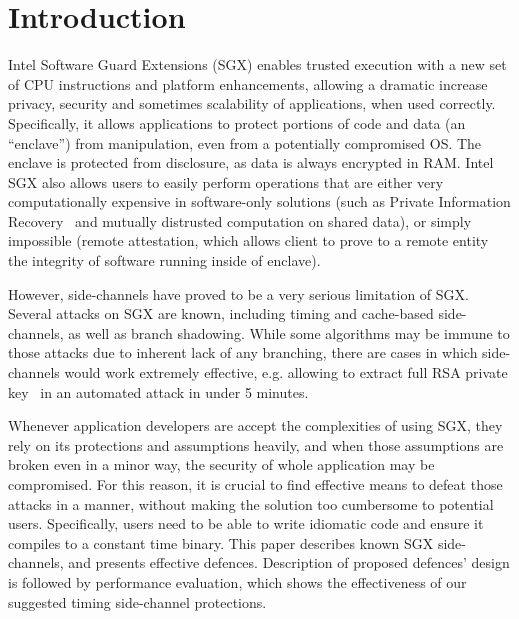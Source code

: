 \documentclass[sigplan, review]{acmart}
\begin{document}
\section{Introduction}
Intel Software Guard Extensions (SGX) enables trusted execution with a new set of CPU instructions and platform enhancements, allowing a dramatic increase privacy, security and sometimes scalability of applications, when used correctly. Specifically, it allows applications to protect portions of code and data (an “enclave”) from manipulation, even from a potentially compromised OS. The enclave is protected from disclosure, as data is always encrypted in RAM. Intel SGX also allows users to easily perform operations that are either very computationally expensive in software-only solutions (such as Private Information Recovery~\cite{signalprivaterecovery} and mutually distrusted computation on shared data), or simply impossible (remote attestation, which allows client to prove to a remote entity the integrity of software running inside of enclave).

However, side-channels have proved to be a very serious limitation of SGX. Several attacks on SGX are known, including timing and cache-based side-channels, as well as branch shadowing. While some algorithms may be immune to those attacks due to inherent lack of any branching, there are cases in which side-channels would work extremely effective, e.g. allowing to extract full RSA private key~\cite{schwarz2017malware} in an automated attack in under 5 minutes.

Whenever application developers are accept the complexities of using SGX, they rely on its protections and assumptions heavily, and when those assumptions are broken even in a minor way, the security of whole application may be compromised. For this reason, it is crucial to find effective means to defeat those attacks in a manner, without making the solution too cumbersome to potential users. Specifically, users need to be able to write idiomatic code and ensure it compiles to a constant time binary.
This paper describes known SGX side-channels, and presents effective defences. Description of proposed defences’ design is followed by performance evaluation, which shows the effectiveness of our suggested timing side-channel protections.
\end{document}
